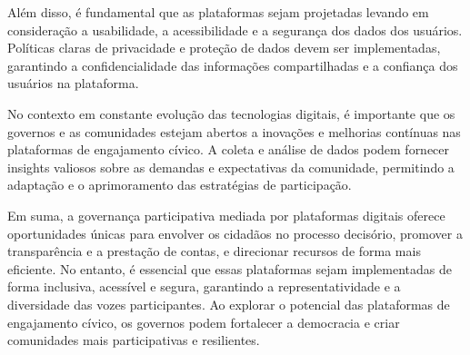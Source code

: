 Além disso, é fundamental que as plataformas sejam projetadas levando em consideração a usabilidade, a acessibilidade e a segurança dos dados dos usuários. Políticas claras de privacidade e proteção de dados devem ser implementadas, garantindo a confidencialidade das informações compartilhadas e a confiança dos usuários na plataforma.

No contexto em constante evolução das tecnologias digitais, é importante que os governos e as comunidades estejam abertos a inovações e melhorias contínuas nas plataformas de engajamento cívico. A coleta e análise de dados podem fornecer insights valiosos sobre as demandas e expectativas da comunidade, permitindo a adaptação e o aprimoramento das estratégias de participação.

Em suma, a governança participativa mediada por plataformas digitais oferece oportunidades únicas para envolver os cidadãos no processo decisório, promover a transparência e a prestação de contas, e direcionar recursos de forma mais eficiente. No entanto, é essencial que essas plataformas sejam implementadas de forma inclusiva, acessível e segura, garantindo a representatividade e a diversidade das vozes participantes. Ao explorar o potencial das plataformas de engajamento cívico, os governos podem fortalecer a democracia e criar comunidades mais participativas e resilientes.